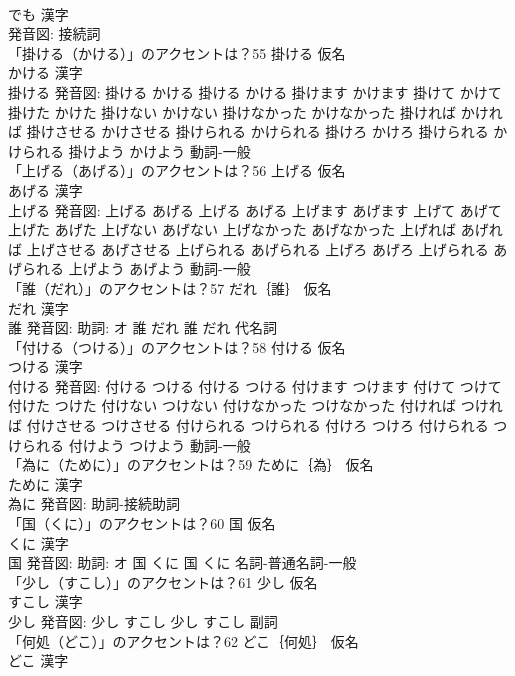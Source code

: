 \documentclass[8pt]{extreport}
\begin{document}
\begin{CJK}{UTF8}{min}
\\	でも 漢字　
\\	発音図:							接続詞 
\\	「掛ける（かける）」のアクセントは？55	掛ける 仮名　
\\	かける 漢字　
\\	掛ける 発音図:	掛ける かける		掛ける かける 掛けます かけます 掛けて かけて 掛けた かけた 掛けない かけない 掛けなかった かけなかった 掛ければ かければ 掛けさせる かけさせる 掛けられる かけられる 掛けろ かけろ 掛けられる かけられる 掛けよう かけよう				動詞-一般 
\\	「上げる（あげる）」のアクセントは？56	上げる 仮名　
\\	あげる 漢字　
\\	上げる 発音図:	上げる あげる		上げる あげる 上げます あげます 上げて あげて 上げた あげた 上げない あげない 上げなかった あげなかった 上げれば あげれば 上げさせる あげさせる 上げられる あげられる 上げろ あげろ 上げられる あげられる 上げよう あげよう				動詞-一般 
\\	「誰（だれ）」のアクセントは？57	だれ｛誰｝ 仮名　
\\	だれ 漢字　
\\	誰 発音図: 助詞: オ	誰 だれ		誰 だれ				代名詞 
\\	「付ける（つける）」のアクセントは？58	付ける 仮名　
\\	つける 漢字　
\\	付ける 発音図:	付ける つける		付ける つける 付けます つけます 付けて つけて 付けた つけた 付けない つけない 付けなかった つけなかった 付ければ つければ 付けさせる つけさせる 付けられる つけられる 付けろ つけろ 付けられる つけられる 付けよう つけよう				動詞-一般 
\\	「為に（ために）」のアクセントは？59	ために｛為｝ 仮名　
\\	ために 漢字　
\\	為に 発音図:							助詞-接続助詞 
\\	「国（くに）」のアクセントは？60	国 仮名　
\\	くに 漢字　
\\	国 発音図: 助詞: オ	国 くに		国 くに				名詞-普通名詞-一般 
\\	「少し（すこし）」のアクセントは？61	少し 仮名　
\\	すこし 漢字　
\\	少し 発音図:	少し すこし		少し すこし				副詞 
\\	「何処（どこ）」のアクセントは？62	どこ｛何処｝ 仮名　
\\	どこ 漢字　

\end{CJK}
\end{document}
